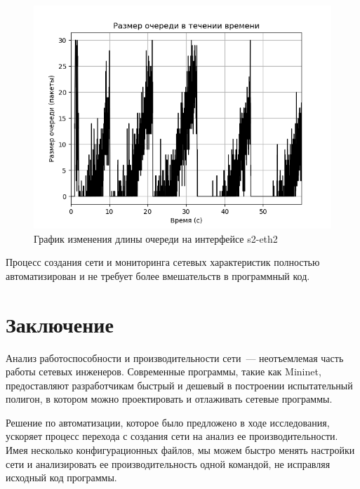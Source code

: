 \documentclass[60x84/16,8pt]{ittmm}
\begin{document}
\begin{figure}[!h]
  \centering
  \includegraphics[width=0.75\linewidth]{qlen}
  \caption{График изменения длины очереди на интерфейсе s2-eth2}
  \label{fig:qlen}
\end{figure}

Процесс создания сети и мониторинга сетевых характеристик полностью
автоматизирован и не требует более вмешательств в программный код.


\section{Заключение}

Анализ работоспособности и производительности сети~--- неотъемлемая
часть работы сетевых инженеров. Современные программы, такие как
Mininet, предоставляют разработчикам быстрый и дешевый в построении
испытательный полигон, в котором можно проектировать и отлаживать
сетевые программы.

Решение по автоматизации, которое было предложено в ходе исследования,
ускоряет процесс перехода с создания сети на анализ ее
производительности. Имея несколько конфигурационных файлов, мы можем
быстро менять настройки сети и анализировать ее производительность
одной командой, не исправляя исходный код программы.





\makealttitle
\end{document}
